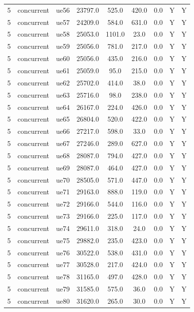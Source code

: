 \begin{table}[ht]
\begin{tabular}{|c|c|c|c|c|c|c|c|c|}
5 & concurrent & ue56 & 23797.0 & 525.0 & 420.0 & 0.0 & Y & Y \\
5 & concurrent & ue57 & 24209.0 & 584.0 & 631.0 & 0.0 & Y & Y \\
5 & concurrent & ue58 & 25053.0 & 1101.0 & 23.0 & 0.0 & Y & Y \\
5 & concurrent & ue59 & 25056.0 & 781.0 & 217.0 & 0.0 & Y & Y \\
5 & concurrent & ue60 & 25056.0 & 435.0 & 216.0 & 0.0 & Y & Y \\
5 & concurrent & ue61 & 25059.0 & 95.0 & 215.0 & 0.0 & Y & Y \\
5 & concurrent & ue62 & 25702.0 & 414.0 & 38.0 & 0.0 & Y & Y \\
5 & concurrent & ue63 & 25716.0 & 98.0 & 238.0 & 0.0 & Y & Y \\
5 & concurrent & ue64 & 26167.0 & 224.0 & 426.0 & 0.0 & Y & Y \\
5 & concurrent & ue65 & 26804.0 & 520.0 & 422.0 & 0.0 & Y & Y \\
5 & concurrent & ue66 & 27217.0 & 598.0 & 33.0 & 0.0 & Y & Y \\
5 & concurrent & ue67 & 27246.0 & 289.0 & 627.0 & 0.0 & Y & Y \\
5 & concurrent & ue68 & 28087.0 & 794.0 & 427.0 & 0.0 & Y & Y \\
5 & concurrent & ue69 & 28087.0 & 464.0 & 427.0 & 0.0 & Y & Y \\
5 & concurrent & ue70 & 28505.0 & 571.0 & 447.0 & 0.0 & Y & Y \\
5 & concurrent & ue71 & 29163.0 & 888.0 & 119.0 & 0.0 & Y & Y \\
5 & concurrent & ue72 & 29166.0 & 544.0 & 116.0 & 0.0 & Y & Y \\
5 & concurrent & ue73 & 29166.0 & 225.0 & 117.0 & 0.0 & Y & Y \\
5 & concurrent & ue74 & 29611.0 & 318.0 & 24.0 & 0.0 & Y & Y \\
5 & concurrent & ue75 & 29882.0 & 235.0 & 423.0 & 0.0 & Y & Y \\
5 & concurrent & ue76 & 30522.0 & 538.0 & 431.0 & 0.0 & Y & Y \\
5 & concurrent & ue77 & 30528.0 & 217.0 & 424.0 & 0.0 & Y & Y \\
5 & concurrent & ue78 & 31165.0 & 497.0 & 428.0 & 0.0 & Y & Y \\
5 & concurrent & ue79 & 31585.0 & 575.0 & 36.0 & 0.0 & Y & Y \\
5 & concurrent & ue80 & 31620.0 & 265.0 & 30.0 & 0.0 & Y & Y \\

\end{tabular}
\end{table}
